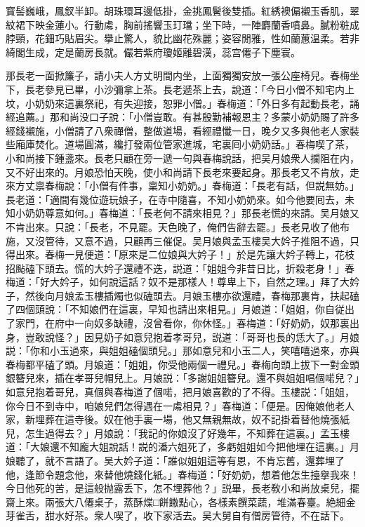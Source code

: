 \begin{myquote}
寳髻巍峨，鳳釵半卸。胡珠環耳邊低掛，金挑鳳鬢後雙插。紅綉襖偏襯玉香肌，翠紋裙下映金蓮小。行動䖏，胸前搖響玉玎璫；坐下時，一陣麝蘭香噴鼻。膩粉粧成脖頸，花鈿巧貼眉尖。擧止驚人，貌比幽花殊麗；姿容閒雅，性如蘭蕙温柔。若非綺閣生成，定是蘭房長就。儼若紫府瓊姬離碧漢，蕊宫僊子下塵寰。
\end{myquote}

那長老一面掀簾子，請小夫人方丈明間内坐，上面獨獨安放一張公座椅兒。春梅坐下，長老參見已畢，小沙彌拿上茶。長老遞茶上去，說道：「今日小僧不知宅内上坟，小奶奶來這裏祭祀，有失迎接，恕罪小僧。」春梅道：「外日多有起動長老，誦經追薦。」那和尚没口子說：「小僧豈敢。有甚殷勤補報恩主？多蒙小奶奶賜了許多經錢襯施，小僧請了八衆禪僧，整做道場，看經禮懺一日，晚夕又多與他老人家裝些廂庫焚化。道場圓滿，纔打發兩位管家進城，宅裏囘小奶奶話。」春梅喫了茶，小和尚接下鍾盞來。長老只顧在旁一遞一句與春梅說話，把吴月娘衆人攔阻在内，又不好出來的。月娘恐怕天晚，使小和尚請下長老來要起身。那長老又不肯放，走來方丈禀春梅說：「小僧有件事，稟知小奶奶。」春梅道：「長老有話，但説無妨。」長老道：「適間有幾位遊玩娘子，在寺中隨喜，不知小奶奶來。如今他要囘去，未知小奶奶尊意如何。」春梅道：「長老何不請來相見？」那長老慌的來請。吴月娘又不肯出來。只說：「長老，不見罷。天色晚了，俺們告辭去罷。」長老見收了他布施，又沒管待，又意不過，只顧再三催促。吴月娘與孟玉樓吴大妗子推阻不過，只得出來。春梅一見便道：「原來是二位娘與大妗子！」於是先讓大妗子轉上，花枝招颭磕下頭去。慌的大妗子還禮不迭，説道：「姐姐今非昔日比，折殺老身！」春梅道：「好大妗子，如何說這話？奴不是那樣人！尊卑上下，自然之理。」拜了大妗子，然後向月娘孟玉樓插燭也似磕頭去。月娘玉樓亦欲還禮，春梅那裏肯，扶起磕了四個頭說：「不知娘們在這裏，早知也請出來相見。」月娘道：「姐姐，你自従出了家門，在府中一向奴多缺禮，沒曾看你，你休怪。」春梅道：「好奶奶，奴那裏出身，豈敢說怪？」因見奶子如意兒抱着孝哥兒，説道：「哥哥也長的恁大了。」月娘説：「你和小玉過來，與姐姐磕個頭兒。」那如意兒和小玉二人，笑嘻嘻過來，亦與春梅都平磕了頭。月娘道：「姐姐，你受他兩個一禮兒。」春梅向頭上拔下一對金頭銀簪兒來，插在孝哥兒帽兒上。月娘説：「多謝姐姐簪兒。還不與姐姐唱個喏兒？」如意兒抱着哥兒，真個與春梅道了個喏，把月娘喜歡的了不得。玉樓説：「姐姐，你今日不到寺中，咱娘兒們怎得遇在一䖏相見？」春梅道：「便是。因俺娘他老人家，新埋葬在這寺後。奴在他手裏一場，他又無親無故，奴不記掛着替他燒張紙兒，怎生過得去？」月娘說：「我記的你娘沒了好幾年，不知葬在這裏。」孟玉樓道：「大娘還不知龐大姐說話！説的潘六姐死了，多虧姐姐如今把他埋在這裏。」月娘聽了，就不言語了。吴大妗子道：「誰似姐姐這等有恩，不肯忘舊，還葬埋了他，逢節令題念他，來替他燒錢化紙。」春梅道：「好奶奶，想着他怎生擡擧我來！今日他死的苦，是這般抛露丢下，怎不埋葬他？」説畢，長老敎小和尚放桌兒，擺齋上來。兩張大八僊桌子，蒸酥煠□餅饊點心，各樣素饌菜蔬，堆滿春臺。絶細金芽雀舌，甜水好茶。衆人喫了，收下家活去。吴大舅自有僧房管待，不在話下。

